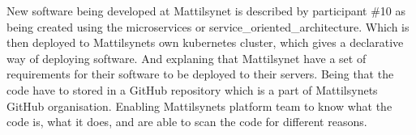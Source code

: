 
New software being developed at Mattilsynet is described by participant \#10 as being created using the \gls{microservices} or \gls{service_oriented_architecture}. Which is then deployed to Mattilsynets own \gls{kubernetes} cluster, which gives a declarative way of deploying software. And explaning that Mattilsynet have a set of requirements for their software to be deployed to their servers. Being that the code have to stored in a GitHub repository which is a part of Mattilsynets GitHub organisation. Enabling Mattilsynets platform team to know what the code is, what it does, and are able to scan the code for different reasons.



